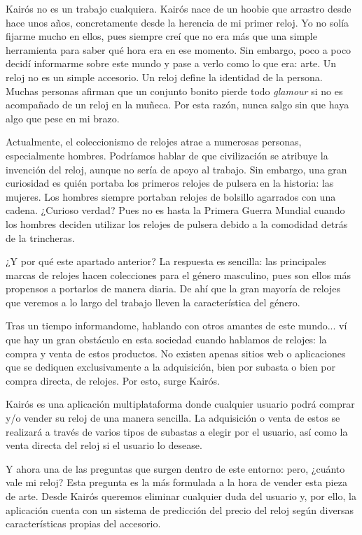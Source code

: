 
Kairós no es un trabajo cualquiera. Kairós nace de un hoobie que arrastro desde hace unos años, concretamente desde la herencia de mi primer reloj. Yo no solía fijarme mucho en ellos, pues siempre creí que no era más que una simple herramienta para saber qué hora era en ese momento. Sin embargo, poco a poco decidí informarme sobre este mundo y pase a verlo como lo que era: arte. Un reloj no es un simple accesorio. Un reloj define la identidad de la persona. Muchas personas afirman que un conjunto bonito pierde todo \emph{glamour} si no es acompañado de un reloj en la muñeca. Por esta razón, nunca salgo sin que haya algo que pese en mi brazo.

Actualmente, el coleccionismo de relojes atrae a numerosas personas, especialmente hombres. Podríamos hablar de que civilización se atribuye la invención del reloj, aunque no sería de apoyo al trabajo. Sin embargo, una gran curiosidad es quién portaba los primeros relojes de pulsera en la historia: las mujeres. Los hombres siempre portaban relojes de bolsillo agarrados con una cadena. ¿Curioso verdad? Pues no es hasta la Primera Guerra Mundial cuando los hombres deciden utilizar los relojes de pulsera debido a la comodidad detrás de la trincheras.

¿Y por qué este apartado anterior? La respuesta es sencilla: las principales marcas de relojes hacen colecciones para el género masculino, pues son ellos más propensos a portarlos de manera diaria. De ahí que la gran mayoría de relojes que veremos a lo largo del trabajo lleven la característica del género.

Tras un tiempo informandome, hablando con otros amantes de este mundo... ví que hay un gran obstáculo en esta sociedad cuando hablamos de relojes: la compra y venta de estos productos. No existen apenas sitios web o aplicaciones que se dediquen exclusivamente a la adquisición, bien por subasta o bien por compra directa, de relojes. Por esto, surge Kairós.

Kairós es una aplicación multiplataforma donde cualquier usuario podrá comprar y/o vender su reloj de una manera sencilla. La adquisición o venta de estos se realizará a través de varios tipos de subastas a elegir por el usuario, así como la venta directa del reloj si el usuario lo desease.

Y ahora una de las preguntas que surgen dentro de este entorno: pero, ¿cuánto vale mi reloj? Esta pregunta es la más formulada a la hora de vender esta pieza de arte. Desde Kairós queremos eliminar cualquier duda del usuario y, por ello, la aplicación cuenta con un sistema de predicción del precio del reloj según diversas características propias del accesorio.

